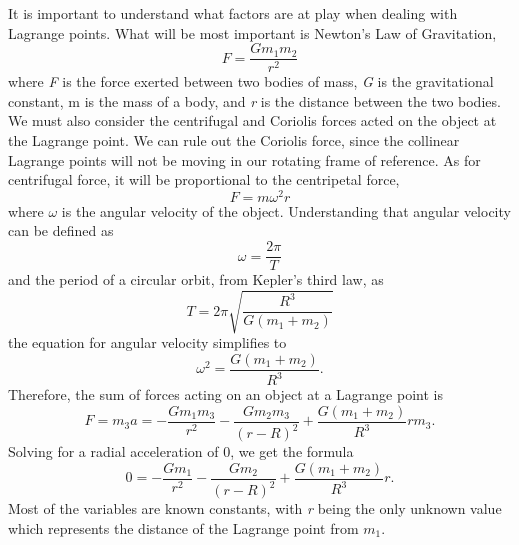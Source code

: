 It is important to understand what factors are at play when dealing with Lagrange points.
What will be most important is Newton's Law of Gravitation,
\begin{equation}
	F = \frac{Gm_1m_2}{r^2}
\end{equation}
where \textit{F} is the force exerted between two bodies of mass, \textit{G} is the gravitational constant, m is the mass of a body, and \textit{r} is the distance between the two bodies.
We must also consider the centrifugal and Coriolis forces acted on the object at the Lagrange point.
We can rule out the Coriolis force, since the collinear Lagrange points will not be moving in our rotating frame of reference.
As for centrifugal force, it will be proportional to the centripetal force,
\begin{equation*}
	F = m\omega^2r
\end{equation*}
where $\omega$ is the angular velocity of the object. Understanding that angular velocity can be defined as
\begin{equation*}
	\omega = \frac{2\pi}{T}
\end{equation*}
and the period of a circular orbit, from Kepler's third law, as
\begin{equation*}
	T = 2\pi\sqrt{\frac{R^3}{G(m_1+m_2)}} %
\end{equation*}
the equation for angular velocity simplifies to
\begin{equation*}
	\omega^2 = \frac{G(m_1+m_2)}{R^3} \text{.} %
\end{equation*} %
Therefore, the sum of forces acting on an object at a Lagrange point is
\begin{equation*}
	F = m_3a = -\frac{Gm_1m_3}{r^2} - \frac{Gm_2m_3}{(r - R)^2} + \frac{G(m_1+m_2)}{R^3}rm_3 \text{.}
\end{equation*}
Solving for a radial acceleration of 0, we get the formula
\begin{equation*}
	0 = -\frac{Gm_1}{r^2} - \frac{Gm_2}{(r - R)^2} + \frac{G(m_1+m_2)}{R^3}r \text{.}
\end{equation*}
Most of the variables are known constants, with \textit{r} being the only unknown value which represents the distance of the Lagrange point from $m_1$.
